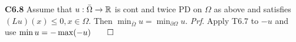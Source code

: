 {\bf C6.8} Assume that $u: \bar{\Omega} \rightarrow \mathbb{R}$ is cont and twice PD on $\Omega$ as above and satisfies $(Lu)(x) \leq 0, x \in \Omega$. Then $\min_{\bar{\Omega}}u = \min_{\partial \Omega} u$. {\it Prf}. Apply T6.7 to $-u$ and use $\min u = - \max(-u) \qed$
